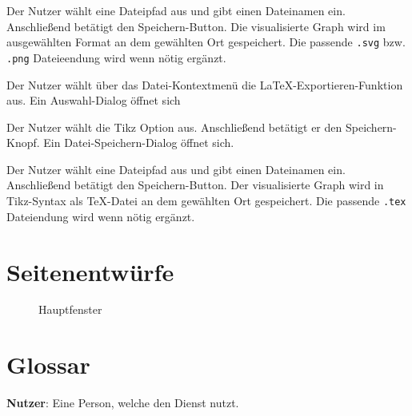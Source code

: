 \documentclass[parskip=full,11pt,twoside]{scrartcl}
\begin{document}
{Der Nutzer wählt eine Dateipfad aus und gibt einen Dateinamen ein. Anschließend betätigt den Speichern-Button.}
{Die visualisierte Graph wird im ausgewählten Format an dem gewählten Ort gespeichert. Die passende \texttt{.svg} bzw. \texttt{.png} Dateieendung wird wenn nötig ergänzt.}



{Der Nutzer wählt über das Datei-Kontextmenü die LaTeX-Exportieren-Funktion aus.}
{Ein Auswahl-Dialog öffnet sich}

{Der Nutzer wählt die Tikz Option aus. Anschließend betätigt er den Speichern-Knopf.}
{Ein Datei-Speichern-Dialog öffnet sich.}

{Der Nutzer wählt eine Dateipfad aus und gibt einen Dateinamen ein. Anschließend betätigt den Speichern-Button.}
{Der visualisierte Graph wird in Tikz-Syntax als TeX-Datei an dem gewählten Ort gespeichert. Die passende \texttt{.tex} Dateiendung wird wenn nötig ergänzt.}



\pagebreak
\appendix

\section{Seitenentwürfe}

\begin{figure}[hb]
\caption{\label{fig:editor}
Hauptfenster
}
\end{figure}

\section{Glossar}

\textbf{Nutzer}:
Eine Person, welche den Dienst nutzt.
\end{document}
